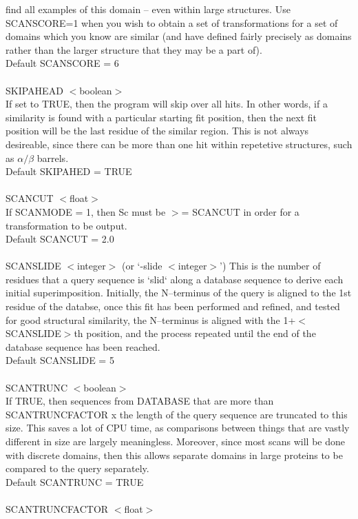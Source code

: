 find all examples of this domain -- even within large structures. 
Use SCANSCORE=1 when  you wish to obtain a set of
transformations for a set of domains which you know are similar
(and have defined fairly precisely as domains rather than the
larger structure that they may be a part of).\\
Default SCANSCORE = 6\\
\\
SKIPAHEAD $<$boolean$>$\\
If set to TRUE, then the program will skip over all hits.  In
other words, if a similarity is found with a particular starting
fit position, then the next fit position will be the last residue
of the similar region.  This is not always desireable, since there can
be more than one hit within  repetetive structures, such as $\alpha/\beta$ barrels.\\
Default SKIPAHED = TRUE\\
\\
SCANCUT $<$float$>$\\
If SCANMODE = 1, then Sc must be $>$= SCANCUT in order for a 
transformation to be output.\\
Default SCANCUT = 2.0\\
\\
SCANSLIDE $<$integer$>$ (or `-slide $<$integer$>$')
This is the number of residues that a query sequence is `slid`
along a database sequence to derive each initial superimposition. 
Initially, the N--terminus of the query is aligned to the 1st
residue of the databse, once this fit has been performed and
refined, and tested for good structural similarity, the N--terminus
is aligned with  the 1+$<$SCANSLIDE$>$th position, and the process
repeated until the end of the database sequence has been reached.\\
Default SCANSLIDE = 5 \\
\\
SCANTRUNC $<$boolean$>$\\
If TRUE, then sequences from DATABASE that are more than
SCANTRUNCFACTOR x the length of the query sequence are truncated to
this size.  This saves a lot of CPU time, as comparisons between 
things that are vastly different in size are largely meaningless. 
Moreover, since most scans will be done with discrete domains, then
this allows separate domains in large proteins to be compared 
to the query separately.\\
Default SCANTRUNC = TRUE\\
\\
SCANTRUNCFACTOR $<$float$>$\\
